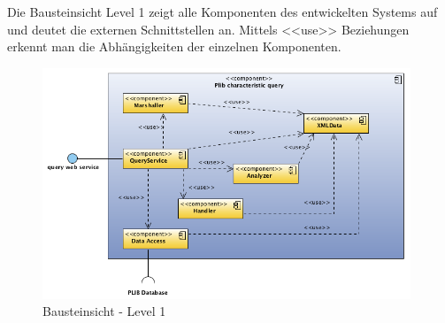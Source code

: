 Die Bausteinsicht Level 1 zeigt alle Komponenten des entwickelten Systems auf und deutet die externen Schnittstellen an. Mittels <<use>> Beziehungen erkennt man die Abhängigkeiten der einzelnen Komponenten. 

\begin{figure}[htbp]
	\centering
		\includegraphics[width=0.98\textwidth]{images/bausteinsicht_plib_level1.png}
	\caption{Bausteinsicht - Level 1}
	\label{fig:bausteinsicht_level1}
\end{figure}

